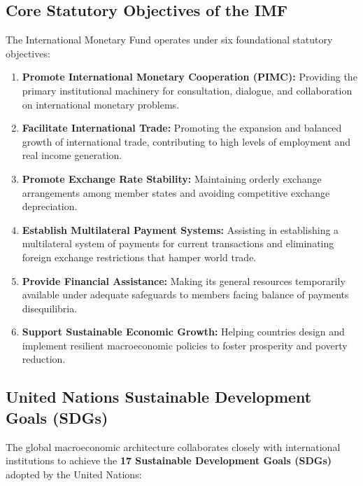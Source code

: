 \subsection{Core Statutory Objectives of the IMF}
The International Monetary Fund operates under six foundational statutory objectives:
\begin{enumerate}[leftmargin=*]
    \item \textbf{Promote International Monetary Cooperation (PIMC):} Providing the primary institutional machinery for consultation, dialogue, and collaboration on international monetary problems.
    \item \textbf{Facilitate International Trade:} Promoting the expansion and balanced growth of international trade, contributing to high levels of employment and real income generation.
    \item \textbf{Promote Exchange Rate Stability:} Maintaining orderly exchange arrangements among member states and avoiding competitive exchange depreciation.
    \item \textbf{Establish Multilateral Payment Systems:} Assisting in establishing a multilateral system of payments for current transactions and eliminating foreign exchange restrictions that hamper world trade.
    \item \textbf{Provide Financial Assistance:} Making its general resources temporarily available under adequate safeguards to members facing balance of payments disequilibria.
    \item \textbf{Support Sustainable Economic Growth:} Helping countries design and implement resilient macroeconomic policies to foster prosperity and poverty reduction.
\end{enumerate}

\subsection{United Nations Sustainable Development Goals (SDGs)}
The global macroeconomic architecture collaborates closely with international institutions to achieve the \textbf{17 Sustainable Development Goals (SDGs)} adopted by the United Nations:

